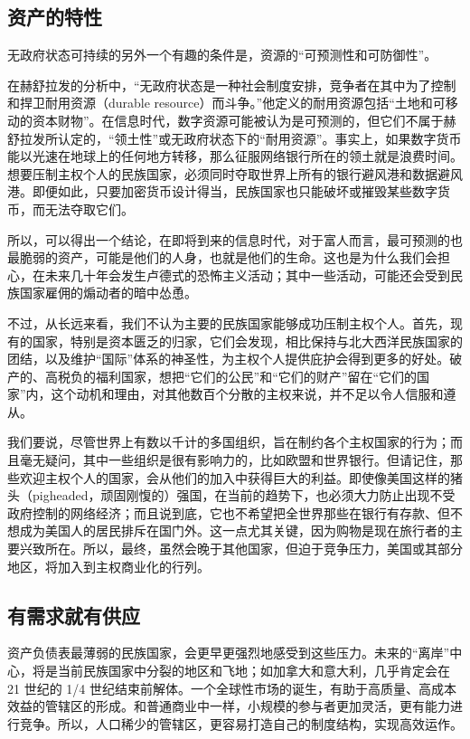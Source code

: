 \subsection{资产的特性}
无政府状态可持续的另外一个有趣的条件是，资源的“可预测性和可防御性”。

在赫舒拉发的分析中，“无政府状态是一种社会制度安排，竞争者在其中为了控制和捍卫耐用资源（durable resource）而斗争。”他定义的耐用资源包括“土地和可移动的资本财物”。在信息时代，数字资源可能被认为是可预测的，但它们不属于赫舒拉发所认定的，“领土性”或无政府状态下的“耐用资源”。事实上，如果数字货币能以光速在地球上的任何地方转移，那么征服网络银行所在的领土就是浪费时间。想要压制主权个人的民族国家，必须同时夺取世界上所有的银行避风港和数据避风港。即便如此，只要加密货币设计得当，民族国家也只能破坏或摧毁某些数字货币，而无法夺取它们。

所以，可以得出一个结论，在即将到来的信息时代，对于富人而言，最可预测的也最脆弱的资产，可能是他们的人身，也就是他们的生命。这也是为什么我们会担心，在未来几十年会发生卢德式的恐怖主义活动；其中一些活动，可能还会受到民族国家雇佣的煽动者的暗中怂恿。

不过，从长远来看，我们不认为主要的民族国家能够成功压制主权个人。首先，现有的国家，特别是资本匮乏的归家，它们会发现，相比保持与北大西洋民族国家的团结，以及维护“国际”体系的神圣性，为主权个人提供庇护会得到更多的好处。破产的、高税负的福利国家，想把“它们的公民”和“它们的财产”留在“它们的国家”内，这个动机和理由，对其他数百个分散的主权来说，并不足以令人信服和遵从。

我们要说，尽管世界上有数以千计的多国组织，旨在制约各个主权国家的行为；而且毫无疑问，其中一些组织是很有影响力的，比如欧盟和世界银行。但请记住，那些欢迎主权个人的国家，会从他们的加入中获得巨大的利益。即使像美国这样的猪头（pigheaded，顽固刚愎的）强国，在当前的趋势下，也必须大力防止出现不受政府控制的网络经济；而且说到底，它也不希望把全世界那些在银行有存款、但不想成为美国人的居民排斥在国门外。这一点尤其关键，因为购物是现在旅行者的主要兴致所在。所以，最终，虽然会晚于其他国家，但迫于竞争压力，美国或其部分地区，将加入到主权商业化的行列。

\subsection{有需求就有供应}
资产负债表最薄弱的民族国家，会更早更强烈地感受到这些压力。未来的“离岸”中心，将是当前民族国家中分裂的地区和飞地；如加拿大和意大利，几乎肯定会在 21 世纪的 1/4 世纪结束前解体。一个全球性市场的诞生，有助于高质量、高成本效益的管辖区的形成。和普通商业中一样，小规模的参与者更加灵活，更有能力进行竞争。所以，人口稀少的管辖区，更容易打造自己的制度结构，实现高效运作。


